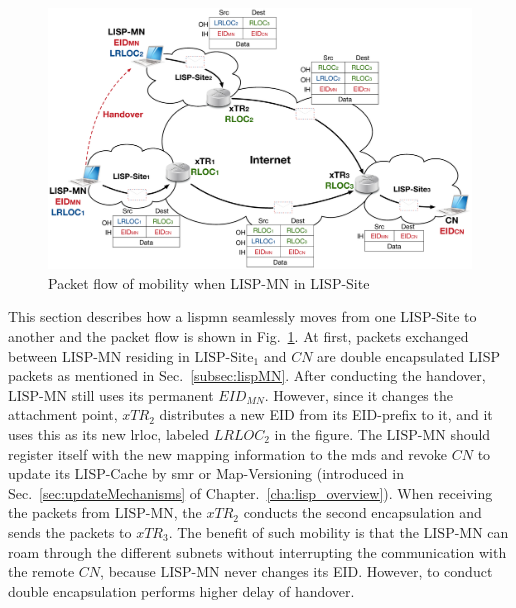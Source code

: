 \begin{figure}[!t]
	\centering
	\includegraphics[width=\textwidth]{Pics/LISP-MN_in_LISP-Site.eps}
	\caption{Packet flow of mobility when LISP-MN in LISP-Site}
	\label{LISP-MN_in_LISP-Site}
\end{figure}

This section describes how a \acrshort{lispmn} seamlessly moves from one LISP-Site to another and the packet flow is shown in Fig.~\ref{LISP-MN_in_LISP-Site}. At first, packets exchanged between $\text{LISP-MN}$ residing in $\text{LISP-Site}_1$ and $CN$ are double encapsulated LISP packets as mentioned in Sec.~\ref{subsec:lispMN}. After conducting the handover, $\text{LISP-MN}$ still uses its permanent $EID_{MN}$. However, since it changes the attachment point, $xTR_2$ distributes a new EID from its EID-prefix to it, and it uses this as its new \acrshort{lrloc}, labeled $LRLOC_2$ in the figure. The $\text{LISP-MN}$ should register itself with the new mapping information to the \acrshort{mds} and revoke $CN$ to update its LISP-Cache by \acrshort{smr} or Map-Versioning (introduced in Sec.~\ref{sec:updateMechanisms} of Chapter.~\ref{cha:lisp_overview}). When receiving the packets from $\text{LISP-MN}$, the $xTR_2$ conducts the second encapsulation and sends the packets to $xTR_3$. The benefit of such mobility is that the $\text{LISP-MN}$ can roam through the different subnets without interrupting the communication with the remote $CN$, because $\text{LISP-MN}$ never changes its EID. However, to conduct double encapsulation performs higher delay of handover.

